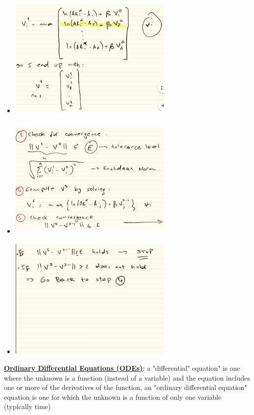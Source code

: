 \documentclass{article}
\begin{document}
\begin{itemize}
\begin{itemize}
\begin{itemize}
            \item \includegraphics[width=8cm, height=6cm]{pic2}
            \item \includegraphics[width=8cm, height=6cm]{pic3}
            \item \includegraphics[width=8cm, height=6cm]{pic4}
        \end{itemize}
    \end{itemize}
\end{itemize}
\vspace{2.5mm}
\par \underline{\bf{Ordinary Differential Equations (ODEs)}}: a "differential" equation" is one where the unknown is a function (instead of a variable) and the equation includes one or more of the derivatives of the function, an "ordinary differential equation" equation is one for which the unknown is a function of only one variable (typically time)
\end{document}
